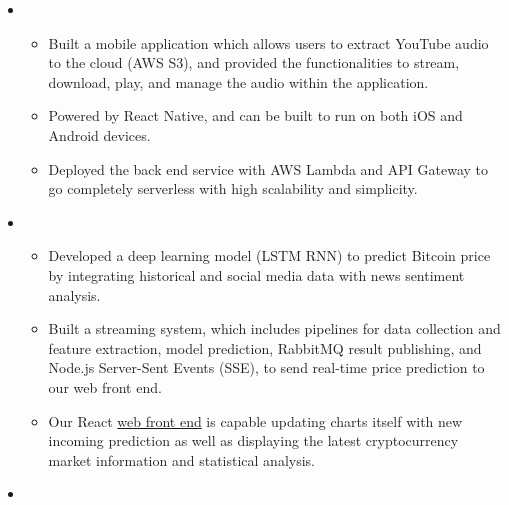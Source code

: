 \documentclass[12pt,a4paper,sans]{moderncv}        %
\begin{document}
\begin{itemize}

\item{

\begin{itemize}
\item{Built a mobile application which allows users to extract YouTube audio to the cloud (AWS S3), and provided the functionalities to stream, download, play, and manage the audio within the application.}
\vspace{3pt}
\item{Powered by React Native, and can be built to run on both iOS and Android devices.}
\vspace{3pt}
\item{Deployed the back end service with AWS Lambda and API Gateway to go completely serverless with high scalability and simplicity.}
\end{itemize}}

\vspace{14pt}

\item{

\begin{itemize}
\item{Developed a deep learning model (LSTM RNN) to predict Bitcoin price by integrating historical and social media data with news sentiment analysis.}
\vspace{3pt}
\item{Built a streaming system, which includes pipelines for data collection and feature extraction, model prediction, RabbitMQ result publishing, and Node.js Server-Sent Events (SSE), to send real-time price prediction to our web front end.}
\vspace{3pt}
\item{Our React \textcolor{cyan}{\href{http://crypto-host.s3-website-us-west-2.amazonaws.com}{web front end}} is capable updating charts itself with new incoming prediction as well as displaying the latest cryptocurrency market information and statistical analysis.}
\end{itemize}}

\vspace{14pt}

\item{

}
\end{itemize}
\end{document}
